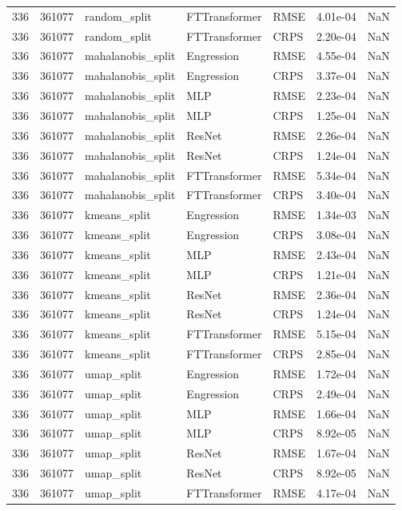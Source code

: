 \begin{tabular}{rrlllrr}
336 & 361077 & random\_split & FTTransformer & RMSE & 4.01e-04 & NaN \\
336 & 361077 & random\_split & FTTransformer & CRPS & 2.20e-04 & NaN \\
336 & 361077 & mahalanobis\_split & Engression & RMSE & 4.55e-04 & NaN \\
336 & 361077 & mahalanobis\_split & Engression & CRPS & 3.37e-04 & NaN \\
336 & 361077 & mahalanobis\_split & MLP & RMSE & 2.23e-04 & NaN \\
336 & 361077 & mahalanobis\_split & MLP & CRPS & 1.25e-04 & NaN \\
336 & 361077 & mahalanobis\_split & ResNet & RMSE & 2.26e-04 & NaN \\
336 & 361077 & mahalanobis\_split & ResNet & CRPS & 1.24e-04 & NaN \\
336 & 361077 & mahalanobis\_split & FTTransformer & RMSE & 5.34e-04 & NaN \\
336 & 361077 & mahalanobis\_split & FTTransformer & CRPS & 3.40e-04 & NaN \\
336 & 361077 & kmeans\_split & Engression & RMSE & 1.34e-03 & NaN \\
336 & 361077 & kmeans\_split & Engression & CRPS & 3.08e-04 & NaN \\
336 & 361077 & kmeans\_split & MLP & RMSE & 2.43e-04 & NaN \\
336 & 361077 & kmeans\_split & MLP & CRPS & 1.21e-04 & NaN \\
336 & 361077 & kmeans\_split & ResNet & RMSE & 2.36e-04 & NaN \\
336 & 361077 & kmeans\_split & ResNet & CRPS & 1.24e-04 & NaN \\
336 & 361077 & kmeans\_split & FTTransformer & RMSE & 5.15e-04 & NaN \\
336 & 361077 & kmeans\_split & FTTransformer & CRPS & 2.85e-04 & NaN \\
336 & 361077 & umap\_split & Engression & RMSE & 1.72e-04 & NaN \\
336 & 361077 & umap\_split & Engression & CRPS & 2.49e-04 & NaN \\
336 & 361077 & umap\_split & MLP & RMSE & 1.66e-04 & NaN \\
336 & 361077 & umap\_split & MLP & CRPS & 8.92e-05 & NaN \\
336 & 361077 & umap\_split & ResNet & RMSE & 1.67e-04 & NaN \\
336 & 361077 & umap\_split & ResNet & CRPS & 8.92e-05 & NaN \\
336 & 361077 & umap\_split & FTTransformer & RMSE & 4.17e-04 & NaN \\

\end{tabular}
